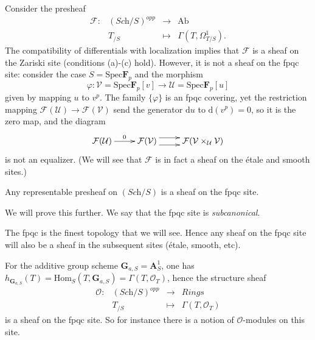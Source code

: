\begin{example}
\label{example-quasi-coherent}
Consider the presheaf
$$
\begin{matrix}
\mathcal{F} : & (\textit{Sch}/S)^{opp} & \to & \text{Ab} \\
& T_{/S} & \mapsto & \Gamma(T, \Omega^1_{T/S}).
\end{matrix}
$$
The compatibility of differentials with localization implies that
$\mathcal{F}$ is a sheaf on the Zariski site (conditions (a)-(c) hold).
However, it is not a sheaf on the fpqc site: consider the case
$S = \text{Spec} \mathbf{F}_p$ and the morphism
$$
\varphi: \mathcal{V} =
\text{Spec} \mathbf{F}_p[v] \to \mathcal{U} =
\text{Spec} \mathbf{F}_p[u]
$$
given by mapping $u$ to $v^p$. The family $\{\varphi \}$ is an fpqc covering,
yet the restriction mapping $\mathcal{F}(\mathcal{U}) \to
\mathcal{F}(\mathcal{V})$ send the generator $\mathrm{d} u$ to $\mathrm{d}(v^p)
= 0$, so it is the zero map, and the diagram
$$
\xymatrix{
\mathcal{F}(\mathcal{U}) \ar[r]^{0} &
\mathcal{F}(\mathcal{V}) \ar@<1ex>[r] \ar@<-1ex>[r] &
\mathcal{F}(\mathcal{V} \times_\mathcal{U} \mathcal{V})
}
$$
is not an equalizer. (We will see that $\mathcal{F}$ is in fact a sheaf on the
\'etale and smooth sites.)
\end{example}

\begin{lemma}
\label{lemma-representable-sheaf-fpqc}
Any representable presheaf on $(\textit{Sch}/S)$ is a sheaf on the fpqc site.
\end{lemma}

\noindent
We will prove this further. We say that the fpqc site is {\it subcanonical}.

\begin{remark}
\label{remark-fpqc-finest}
The fpqc is the finest topology that we will see. Hence any sheaf on the
fpqc site will also be a sheaf in the subsequent sites (\'etale, smooth, etc).
\end{remark}

\begin{example}
\label{example-additive-group-sheaf}
For the additive group scheme $\mathbf{G}_{a,S} = \mathbf{A}^1_S$, one has
$h_{\mathbf{G}_{a,S}} (T) = \text{Hom}_S (T,\mathbf{G}_{a,S}) =
\Gamma(T,\mathcal{O}_T)$, hence the structure sheaf
$$
\begin{matrix}
\mathcal{O} : &
(\textit{Sch}/S)^{opp} &
\to &
\textit{Rings} \\
&
T_{/S} &
\mapsto &
\Gamma(T, \mathcal{O}_{T})
\end{matrix}
$$
is a sheaf on the fpqc site. So for instance there is a notion of
$\mathcal{O}$-modules on this site.
\end{example}




